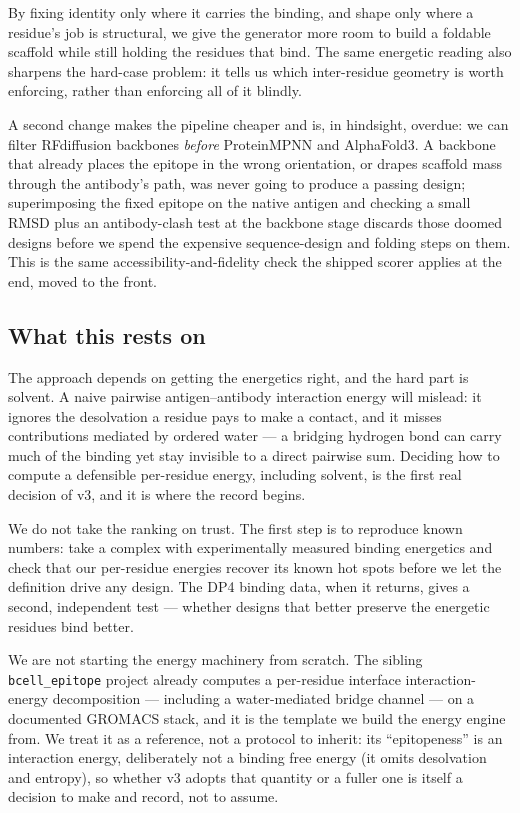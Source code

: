 By fixing identity only where it carries the binding, and shape only where a residue's job is
structural, we give the generator more room to build a foldable scaffold while still holding the
residues that bind. The same energetic reading also sharpens the hard-case problem: it tells us
which inter-residue geometry is worth enforcing, rather than enforcing all of it blindly.

A second change makes the pipeline cheaper and is, in hindsight, overdue: we can filter RFdiffusion
backbones \emph{before} ProteinMPNN and AlphaFold3. A backbone that already places the epitope in
the wrong orientation, or drapes scaffold mass through the antibody's path, was never going to
produce a passing design; superimposing the fixed epitope on the native antigen and checking a small
RMSD plus an antibody-clash test at the backbone stage discards those doomed designs before we spend
the expensive sequence-design and folding steps on them. This is the same accessibility-and-fidelity
check the shipped scorer applies at the end, moved to the front.

\subsection{What this rests on}
The approach depends on getting the energetics right, and the hard part is solvent. A
naive pairwise antigen--antibody interaction energy will mislead: it ignores the desolvation a
residue pays to make a contact, and it misses contributions mediated by ordered water --- a bridging
hydrogen bond can carry much of the binding yet stay invisible to a direct pairwise sum. Deciding how to compute a
defensible per-residue energy, including solvent, is the first real decision of v3, and it is where
the record begins.

We do not take the ranking on trust. The first step is to reproduce known numbers: take a
complex with experimentally measured binding energetics and check that our per-residue energies
recover its known hot spots before we let the definition drive any design. The DP4 binding data,
when it returns, gives a second, independent test --- whether designs that better preserve the
energetic residues bind better.

We are not starting the energy machinery from scratch. The sibling \texttt{bcell\_epitope} project
already computes a per-residue interface interaction-energy decomposition --- including a
water-mediated bridge channel --- on a documented GROMACS stack, and it is the template we build the
energy engine from. We treat it as a reference, not a protocol to inherit: its ``epitopeness'' is an
interaction energy, deliberately not a binding free energy (it omits desolvation and entropy), so
whether v3 adopts that quantity or a fuller one is itself a decision to make and record, not to
assume.

